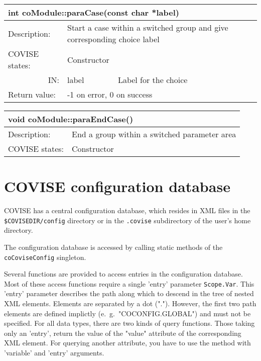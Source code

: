 \begin{longtable}{|p{4cm}|p{2.5cm}|p{7cm}|}
\hline
\multicolumn{3}{|p{13.5cm}|}{\bf int coModule::paraCase(const char *label)}\\
\hline
{Description:}   
               & \multicolumn{2}{|p{9.5cm}|}{Start a case within a switched group and
	                            give corresponding choice label} \\
\hline
{COVISE states:} & \multicolumn{2}{|p{9.5cm}|}{Constructor} \\
\hline
\multicolumn{1}{|r|}{IN:} & {label} 
                             & {Label for the choice}\\
\hline
{Return value:}  
                        & \multicolumn{2}{|p{9.5cm}|}{-1 on error, 0 on success} \endhead
\hline
\end{longtable}

\begin{longtable}{|p{4cm}|p{10cm}|}
\hline
\multicolumn{2}{|p{13.5cm}|}{\bf void coModule::paraEndCase()}\\
\hline
{Description:}   
               & {End a group within a switched parameter area} \\
\hline
{COVISE states:} & {Constructor} \endhead
\hline
\end{longtable}

\section{COVISE configuration database}

COVISE has a central configuration database, which resides in XML files in the 
{\tt \$COVISEDIR/config} directory or in the {\tt .covise} subdirectory of the user's
home directory.

The configuration database is accessed by calling static methods of the
{\tt coCoviseConfig} singleton.


Several functions are provided to access entries in the configuration database. Most of 
these access functions require a single 'entry' parameter {\tt Scope.Var}.
This 'entry' parameter describes the path along which to descend in the tree of
nested XML elements.
Elements are separated by a dot (".").
However, the first two path elements are defined implictly (e.~g.\ "COCONFIG.GLOBAL") and must
not be specified.
For all data types, there are two kinds of query functions.
Those taking only an 'entry', return the value of the "value" attribute of the corresponding XML
element.
For querying another attribute, you have to use the method with 'variable' and 'entry' arguments.

